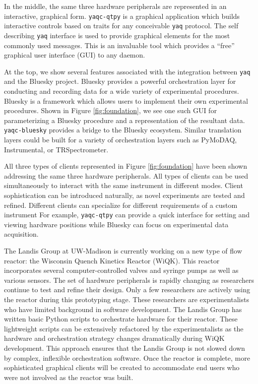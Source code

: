 \documentclass[aip, amsmath, amssymb, reprint,]{revtex4-1}
\newcommand\yaq{\texttt{yaq}}
\begin{document}
In the middle, the same three hardware peripherals are represented in an interactive, graphical form.
\texttt{yaqc-qtpy}\cite{yaqc-qtpy} is a graphical application which builds interactive controls based on traits for any conceivable \yaq{} protocol.
The self describing \yaq{} interface is used to provide graphical elements for the most commonly used messages.
This is an invaluable tool which provides a ``free'' graphical user interface (GUI) to any daemon.

At the top, we show several features associated with the integration between \yaq{} and the Bluesky project\cite{AllanDanielB2019a}.
Bluesky provides a powerful orchestration layer for conducting and recording data for a wide variety of experimental procedures.
Bluesky is a framework which allows users to implement their own experimental procedures.
Shown in Figure \ref{fig:foundation}, we see one such GUI for parameterizing a Bluesky procedure and a representation of the resultant data.
\texttt{yaqc-bluesky}\cite{yaqc-bluesky} provides a bridge to the Bluesky ecosystem.
Similar translation layers could be built for a variety of orchestration layers such as PyMoDAQ\cite{WeberSebastien2021a}, Instrumental\cite{Bogdanowicz2022}, or TRSpectrometer\cite{trspectrometer}.

All three types of clients represented in Figure \ref{fig:foundation} have been shown addressing the same three hardware peripherals.
All types of clients can be used simultaneously to interact with the same instrument in different modes.
Client sophistication can be introduced naturally, as novel experiments are tested and refined.
Different clients can specialize for different requirements of a custom instrument
For example, \texttt{yaqc-qtpy} can provide a quick interface for setting and viewing hardware positions while Bluesky can focus on experimental data acquisition.



The Landis Group at UW-Madison is currently working on a new type of flow reactor: the Wisconsin Quench Kinetics Reactor (WiQK).
This reactor incorporates several computer-controlled valves and syringe pumps as well as various sensors.
The set of hardware peripherals is rapidly changing as researchers continue to test and refine their design.
Only a few researchers are actively using the reactor during this prototyping stage.
These researchers are experimentalists who have limited background in software development.
The Landis Group has written basic Python scripts to orchestrate hardware for their reactor.
These lightweight scripts can be extensively refactored by the experimentalists as the hardware and orchestration strategy changes dramatically during WiQK development.
This approach ensures that the Landis Group is not slowed down by complex, inflexible orchestration software.
Once the reactor is complete, more sophisticated graphical clients will be created to accommodate end users who were not involved as the reactor was built.
\end{document}

